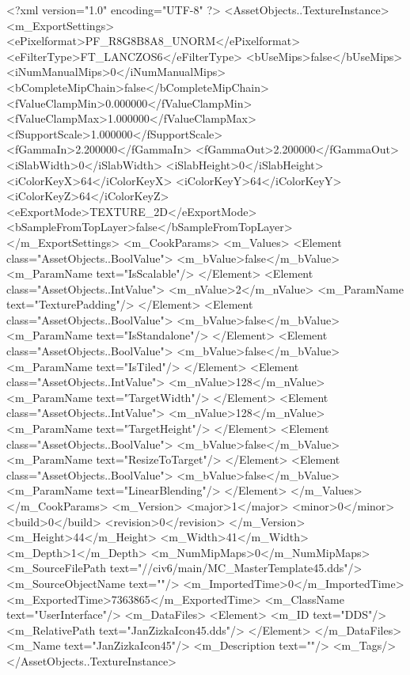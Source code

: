 <?xml version="1.0" encoding="UTF-8" ?>
<AssetObjects..TextureInstance>
	<m_ExportSettings>
		<ePixelformat>PF_R8G8B8A8_UNORM</ePixelformat>
		<eFilterType>FT_LANCZOS6</eFilterType>
		<bUseMips>false</bUseMips>
		<iNumManualMips>0</iNumManualMips>
		<bCompleteMipChain>false</bCompleteMipChain>
		<fValueClampMin>0.000000</fValueClampMin>
		<fValueClampMax>1.000000</fValueClampMax>
		<fSupportScale>1.000000</fSupportScale>
		<fGammaIn>2.200000</fGammaIn>
		<fGammaOut>2.200000</fGammaOut>
		<iSlabWidth>0</iSlabWidth>
		<iSlabHeight>0</iSlabHeight>
		<iColorKeyX>64</iColorKeyX>
		<iColorKeyY>64</iColorKeyY>
		<iColorKeyZ>64</iColorKeyZ>
		<eExportMode>TEXTURE_2D</eExportMode>
		<bSampleFromTopLayer>false</bSampleFromTopLayer>
	</m_ExportSettings>
	<m_CookParams>
		<m_Values>
			<Element class="AssetObjects..BoolValue">
				<m_bValue>false</m_bValue>
				<m_ParamName text="IsScalable"/>
			</Element>
			<Element class="AssetObjects..IntValue">
				<m_nValue>2</m_nValue>
				<m_ParamName text="TexturePadding"/>
			</Element>
			<Element class="AssetObjects..BoolValue">
				<m_bValue>false</m_bValue>
				<m_ParamName text="IsStandalone"/>
			</Element>
			<Element class="AssetObjects..BoolValue">
				<m_bValue>false</m_bValue>
				<m_ParamName text="IsTiled"/>
			</Element>
			<Element class="AssetObjects..IntValue">
				<m_nValue>128</m_nValue>
				<m_ParamName text="TargetWidth"/>
			</Element>
			<Element class="AssetObjects..IntValue">
				<m_nValue>128</m_nValue>
				<m_ParamName text="TargetHeight"/>
			</Element>
			<Element class="AssetObjects..BoolValue">
				<m_bValue>false</m_bValue>
				<m_ParamName text="ResizeToTarget"/>
			</Element>
			<Element class="AssetObjects..BoolValue">
				<m_bValue>false</m_bValue>
				<m_ParamName text="LinearBlending"/>
			</Element>
		</m_Values>
	</m_CookParams>
	<m_Version>
		<major>1</major>
		<minor>0</minor>
		<build>0</build>
		<revision>0</revision>
	</m_Version>
	<m_Height>44</m_Height>
	<m_Width>41</m_Width>
	<m_Depth>1</m_Depth>
	<m_NumMipMaps>0</m_NumMipMaps>
	<m_SourceFilePath text="//civ6/main/MC_MasterTemplate\Textures\JanZizkaIcon45.dds"/>
	<m_SourceObjectName text=""/>
	<m_ImportedTime>0</m_ImportedTime>
	<m_ExportedTime>7363865</m_ExportedTime>
	<m_ClassName text="UserInterface"/>
	<m_DataFiles>
		<Element>
			<m_ID text="DDS"/>
			<m_RelativePath text="JanZizkaIcon45.dds"/>
		</Element>
	</m_DataFiles>
	<m_Name text="JanZizkaIcon45"/>
	<m_Description text=""/>
	<m_Tags/>
</AssetObjects..TextureInstance>

